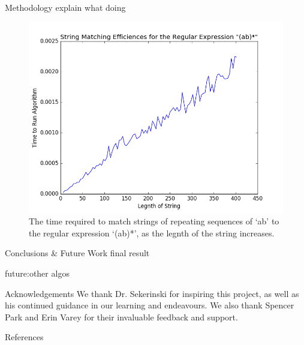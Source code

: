 \documentclass[22pt]{beamer}
\begin{document}
\begin{frame}[fragile]
\begin{textblock}{7.25}
\begin{block}{Methodology}
explain what doing

\begin{figure}
\includegraphics[scale=2]{result_1.PNG}
\caption{The time required to match strings of repeating sequences of `ab' to the regular expression `(ab)*', as the legnth of the string increases.}
\end{figure}


\end{block}


\begin{block}{Conclusions \& Future Work}
final result

future:other algos
\end{block}


\begin{block}{Acknowledgements}
We thank Dr. Sekerinski for inspiring this project, as well as his continued guidance in our learning and endeavours. We also thank Spencer Park and Erin Varey for their invaluable feedback and support. 
\end{block}

\begin{block}{References}

{\scriptsize
}
\end{block}

\end{textblock}

%
%

\end{frame}
\end{document}
